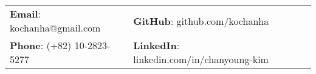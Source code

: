 \documentclass[letterpaper, 11pt]{article}
\begin{document}


\vspace{0.5cm} 
\begin{flushleft}
\begin{tabular}{lll}
\textbf{Email}: kochanha@gmail.com      &
\hspace{0.55in} \textbf{GitHub}: github.com/kochanha \\


\textbf{Phone}: (+82) 10-2823-5277   & 
\hspace{0.55in} \textbf{LinkedIn}: linkedin.com/in/chanyoung-kim   & 
\end{tabular}
\end{flushleft}


\setlength{\tabcolsep}{8pt}
\end{document}

